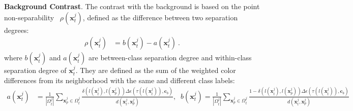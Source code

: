 %
%

\vspace{2mm}
\noindent\textbf{Background Contrast}.
The contrast with the background is based on the point non-separability~\cite{Wang2018} $\rho (\mathbf{x}^j_t)$, defined as the difference between two  separation degrees: 
\begin{align}
\rho(\mathbf{x}^j_t)&= b(\mathbf{x}^j_t)-a(\mathbf{x}^j_t) \ .
\end{align}
where $b(\mathbf{x}^j_t)$ and $a(\mathbf{x}^j_t)$ are between-class separation degree and within-class separation degree  of $\mathbf{x}^j_t$. They are defined as the sum of the weighted color differences from its neighborhood with the same and different class labels:
\begin{align}
a(\mathbf{x}^j_t)&=\frac{1}{|\Omega^j_t|}\sum_{\mathbf{x}^j_p \in \Omega^j_t } \frac{\delta(l(\mathbf{x}^j_t), l(\mathbf{x}^j_p)) 
\Delta\epsilon(\tau(l(\mathbf{x}^j_t)),\mathbf{c}_b)
}{d(\mathbf{x}^j_t,\mathbf{x}^j_p)} , \;\;
b(\mathbf{x}^j_t)=\frac{1}{|\Omega^j_t|}\sum_{\mathbf{x}^j_p \in \Omega^j_t } \frac{1-\delta(l(\mathbf{x}^j_t), l(\mathbf{x}^j_p))\Delta\epsilon(\tau(l(\mathbf{x}^j_t)),\mathbf{c}_b)}{d(\mathbf{x}^j_t,\mathbf{x}^j_p)}  \nonumber
\end{align}

